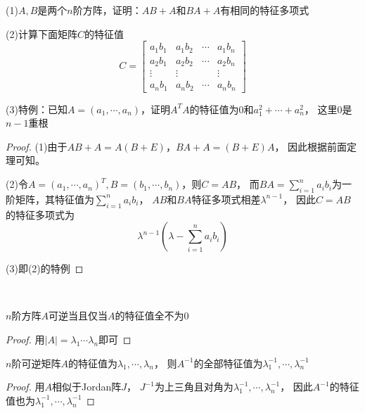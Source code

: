 \begin{exercise}[相关结论]
  (1)$A,B$是两个$n$阶方阵，证明：$AB + A$和$BA + A$有相同的特征多项式

  (2)计算下面矩阵$C$的特征值
  \begin{equation*}
    C = \left[
      \begin{array}{cccc}
        a_1b_1&a_1b_2&\cdots&a_1b_n \\
              a_2b_1&a_2b_2&\cdots&a_2b_n \\
              \vdots&\vdots&&\vdots \\
              a_nb_1&a_nb_2&\cdots&a_nb_n
      \end{array}
    \right]
  \end{equation*}

  (3)特例：已知$A = (a_1,\cdots,a_n)$，证明$A^TA$的特征值为$0$和$a_1^2 + \cdots + a_n^2$，
  这里$0$是$n-1$重根
\end{exercise}

\begin{proof}
  (1)由于$AB +A = A(B + E)$，$BA + A = (B + E)A$，
  因此根据前面定理可知。

  (2)令$A = (a_1,\cdots,a_n)^T, B = (b_1,\cdots,b_n)$，则$C = AB$，
  而$BA = \sum\limits_{i = 1}^n a_ib_i$为一阶矩阵，其特征值为$\sum\limits_{i = 1}^n a_ib_i$，
  $AB$和$BA$特征多项式相差$\lambda^{n-1}$，
  因此$C = AB$的特征多项式为
  \begin{equation*}
    \lambda^{n-1}(\lambda - \sum\limits_{i = 1}^n a_ib_i)
  \end{equation*}

  (3)即(2)的特例
\end{proof}

~

\begin{theorem}[可逆的特征值表达]
  $n$阶方阵$A$可逆当且仅当$A$的特征值全不为$0$
\end{theorem}

\begin{proof}
  用$|A| = \lambda_1 \cdots \lambda_n$即可
\end{proof}

\begin{theorem}[逆矩阵的特征值]
  $n$阶可逆矩阵$A$的特征值为$\lambda_1,\cdots,\lambda_n$，
  则$A^{-1}$的全部特征值为$\lambda_1^{-1},\cdots,\lambda_n^{-1}$
\end{theorem}

\begin{proof}
  用$A$相似于Jordan阵$J$，
  $J^{-1}$为上三角且对角为$\lambda_1^{-1},\cdots,\lambda_n^{-1}$，
  因此$A^{-1}$的特征值也为$\lambda_1^{-1},\cdots,\lambda_n^{-1}$
\end{proof}

